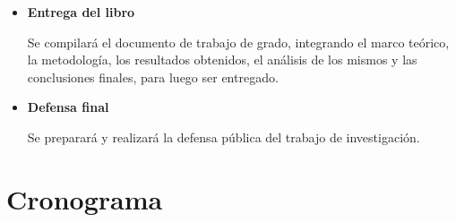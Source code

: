 \begin{itemize}
Los resultados del modelo se compararán con datos observacionales, determinando los umbrales críticos en los parámetros iniciales de las CMEs (velocidad, aceleración y densidad) que definen la probabilidad y el resultado de una interacción. Para ello, se implementará un análisis de sensibilidad paramétrica, variando metódicamente las condiciones iniciales dentro de rangos físicamente plausibles, buscando los rangos de parámetros que conlleven a una interacción. Finalmente, se determinarán las razones entre las propiedades cinemáticas de las CMEs que favorecen una interacción, es decir, cuántas veces debe ser, por ejemplo, la velocidad de la segunda CME con respecto a la primera para que interactúen.
\item \textbf{Entrega del libro}

Se compilará el documento de trabajo de grado, integrando el marco teórico, la metodología, los resultados obtenidos, el análisis de los mismos y las conclusiones finales, para luego ser entregado.
\item \textbf{Defensa final}

Se preparará y realizará la defensa pública del trabajo de investigación.

\end{itemize}

\newpage

\section{Cronograma}

